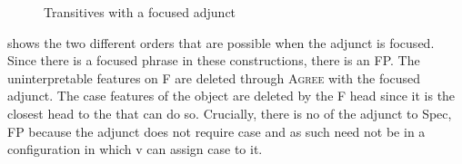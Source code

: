 \documentclass[output=paper,newtxmath,modfonts,nonflat,hidelinks]{langsci/langscibook}
\begin{document}
  
\begin{figure}
%
\caption{\label{fig:selvanathan:7}Transitives with a focused adjunct}
\end{figure}


 shows the two different orders that are possible when the adjunct is focused. Since there is a focused phrase in these constructions, there is an FP. The uninterpretable  features on F are deleted through \textsc{Agree} with the focused adjunct. The case features of the object are deleted by the F head since it is the closest head to the  that can do so. Crucially, there is no  of the adjunct to Spec, FP because the adjunct does not require case and as such need not be in a configuration in which v can assign case to it. 
\end{document}
